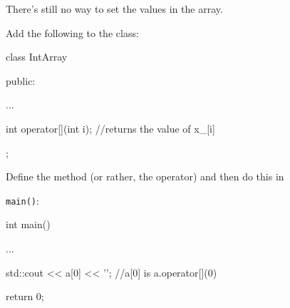 There's still no way to set the values in the array.

Add the following to the class:



\begin{consolethree}[escapeinside=||]

class IntArray

{

public:

    ...



    int operator[](int i); //returns the value of x_[i]

};

\end{consolethree}



Define the method (or rather, the operator) and then do this in

\texttt{main()}:



\begin{consolethree}[escapeinside=||]

int main()

{

    ...

    std::cout << a[0] << '\n'; //a[0] is a.operator[](0)



    return 0;

}

\end{consolethree}

